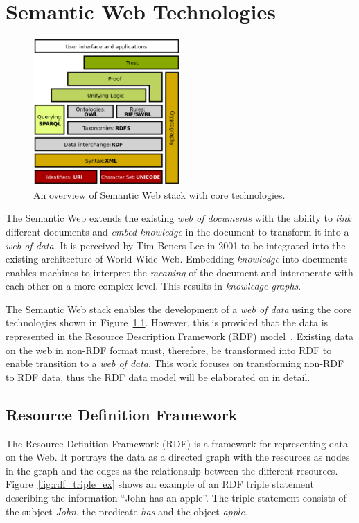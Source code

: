 \chapter{Semantic Web Technologies}
\label{chap:semantic_web}


\begin{figure}[htbp]
    \centering
    \includegraphics[width=0.5\textwidth]{fig/Semantic_web_stack.svg.png}
    \caption{An overview of Semantic Web stack with core technologies\cite{sem_web_stack}.}
    \label{fig:sem_web_stack}
\end{figure}

The Semantic Web extends the existing \emph{web of documents} with the ability 
to \emph{link} different documents and \emph{embed knowledge} in the document
to transform it into a \emph{web of data}. It is perceived by Tim Beners-Lee in 
2001\cite{bernerslee2001semantic} to be integrated into the existing architecture 
of World Wide Web. Embedding \emph{knowledge} into documents enables machines to
interpret the \emph{meaning} of the document and interoperate with each other on 
a more complex level. This results in \emph{knowledge graphs}. 

The Semantic Web stack enables the development of a \emph{web of data} using 
the core technologies shown in Figure~\ref{fig:sem_web_stack}. 
However, this is provided that the data is represented in the 
Resource Description Framework (RDF) model~\cite{rdf_concepts}. 
Existing data on the web in non-RDF format must, therefore, be transformed 
into RDF to enable transition to a \emph{web of data}. This work 
focuses on transforming non-RDF to RDF data, thus the RDF data model will be elaborated on
in detail. 



\section{Resource Definition Framework}
The Resource Definition Framework (RDF) \cite{rdf_concepts} is a framework for representing data on the Web.
It portrays the data as a directed graph with the resources as nodes in the graph and the
edges as the relationship between the different resources.
Figure~\ref{fig:rdf_triple_ex} shows an example of an RDF triple statement describing
the information “John has an apple”.
The triple statement consists of the subject \textit{John}, the predicate \textit{has}
and the object \textit{apple}.

